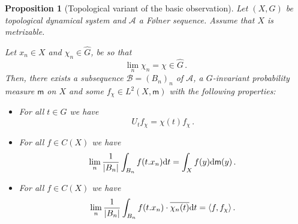 \documentclass [14pt]{amsart}
\numberwithin{equation}{section}
\newcommand{\cA}{{\mathcal A}}
\newcommand{\cB}{{\mathcal B}}
\newcommand{\mm}{\mathsf{m}}
\newcommand{\dd}{\mbox{\rm d}}
\newtheorem{prop}[theorem]{Proposition}
\begin{document}
\begin{prop}[Topological variant of the basic observation]\label{existence-m} Let $(X,G)$ be topological dynamical system and $\cA$ a F\o lner sequence. Assume that $X$ is metrizable.

Let $x_n  \in X$ and $\chi_n \in \widehat{G}$, be so that
\[
\lim_n \chi_n = \chi \in \widehat{G} \,.
\]
Then, there exists a subsequence $\cB=(B_n)_n$ of $\cA$, a $G$-invariant probability measure $\mm$ on $X$ and some $f_\chi \in L^2 (X, \mm)$ with  the following properties:
\begin{itemize}
  \item[(a)] For all $t \in G$ we have
  \[
  U_t f_\chi = \chi(t) f_\chi \,.
  \]
  \item[(b)] For all $f \in C(X)$ we have
  $$\lim_n \frac{1}{|B_n|} \int_{B_n} f(t.x_n) \dd t = \int_X f(y)  \dd \mm(y) \,.$$
  \item[(c)] For all $f \in C(X)$ we have
  $$\lim_n \frac{1}{|B_n|} \int_{B_n} f(t.x_n) \cdot \overline{\chi_n(t)} \dd t= \langle f, f_\chi\rangle \,.$$
\end{itemize}
\end{prop}
\end{document}
